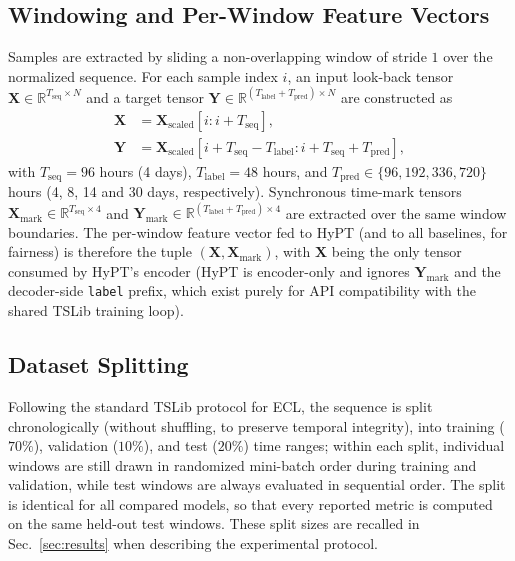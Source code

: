 \documentclass[10pt,journal]{IEEEtran}
\newcommand{\secref}[1]{Sec.~\ref{#1}}
\begin{document}
\subsection{Windowing and Per-Window Feature Vectors}
Samples are extracted by sliding a non-overlapping window of stride $1$ over the normalized sequence. For each sample index $i$, an input look-back tensor $\bm{X} \in \mathbb{R}^{T_{\mathrm{seq}} \times N}$ and a target tensor $\bm{Y} \in \mathbb{R}^{(T_{\mathrm{label}} + T_{\mathrm{pred}}) \times N}$ are constructed as
\begin{align}
\label{eq:windowing_x}
\bm{X} &= \bm{X}_{\mathrm{scaled}}\!\left[i : i + T_{\mathrm{seq}}\right], \\
\label{eq:windowing_y}
\bm{Y} &= \bm{X}_{\mathrm{scaled}}\!\left[i + T_{\mathrm{seq}} - T_{\mathrm{label}} : i + T_{\mathrm{seq}} + T_{\mathrm{pred}}\right],
\end{align}
with $T_{\mathrm{seq}} = 96$ hours (4 days), $T_{\mathrm{label}} = 48$ hours, and $T_{\mathrm{pred}} \in \{96, 192, 336, 720\}$ hours (4, 8, 14 and 30 days, respectively). Synchronous time-mark tensors $\bm{X}_{\mathrm{mark}} \in \mathbb{R}^{T_{\mathrm{seq}} \times 4}$ and $\bm{Y}_{\mathrm{mark}} \in \mathbb{R}^{(T_{\mathrm{label}}+T_{\mathrm{pred}}) \times 4}$ are extracted over the same window boundaries. The per-window feature vector fed to HyPT (and to all baselines, for fairness) is therefore the tuple $(\bm{X}, \bm{X}_{\mathrm{mark}})$, with $\bm{X}$ being the only tensor consumed by HyPT's encoder (HyPT is encoder-only and ignores $\bm{Y}_{\mathrm{mark}}$ and the decoder-side \texttt{label} prefix, which exist purely for API compatibility with the shared TSLib training loop).

\subsection{Dataset Splitting}
Following the standard TSLib protocol for ECL, the sequence is split chronologically (without shuffling, to preserve temporal integrity), into training ($70\%$), validation ($10\%$), and test ($20\%$) time ranges; within each split, individual windows are still drawn in randomized mini-batch order during training and validation, while test windows are always evaluated in sequential order. The split is identical for all compared models, so that every reported metric is computed on the same held-out test windows. These split sizes are recalled in \secref{sec:results} when describing the experimental protocol.
\end{document}

